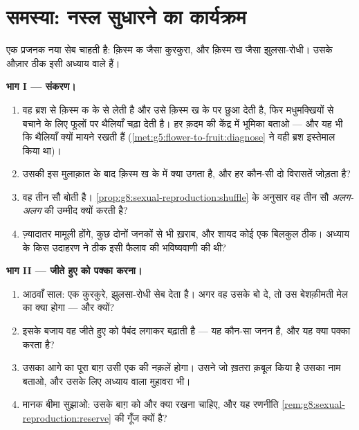 \section{समस्या: नस्ल सुधारने का कार्यक्रम}

\begin{problem}\label{pb:g8:sexual-reproduction:1}
एक प्रजनक नया सेब चाहती है: क़िस्म क जैसा कुरकुरा, और क़िस्म ख जैसा
झुलसा-रोधी। उसके औज़ार ठीक इसी अध्याय वाले हैं।

\medskip\noindent\textbf{भाग I --- संकरण।}
\begin{enumerate}
  \item वह ब्रश से क़िस्म क के  से  लेती है और उसे
        क़िस्म ख के  पर छुआ देती है, फिर मधुमक्खियों से
        बचाने के लिए फूलों पर थैलियाँ चढ़ा देती है। हर क़दम की
        केंद्र में भूमिका बताओ --- और यह भी कि थैलियाँ क्यों मायने
        रखती हैं (\cref{met:g5:flower-to-fruit:diagnose} ने वही ब्रश
        इस्तेमाल किया था)।
  \item उसकी इस मुलाक़ात के बाद क़िस्म ख के  में क्या उगता है, और
        हर  कौन-सी दो विरासतें जोड़ता है?
  \item वह तीन सौ  बोती है।
        \cref{prop:g8:sexual-reproduction:shuffle} के अनुसार वह तीन
        सौ \emph{अलग-अलग}  की उम्मीद क्यों करती है?
  \item ज़्यादातर  मामूली होंगे, कुछ दोनों जनकों से भी ख़राब, और
        शायद कोई एक बिलकुल ठीक। अध्याय के किस उदाहरण ने ठीक इसी
        फैलाव की भविष्यवाणी की थी?
\end{enumerate}

\medskip\noindent\textbf{भाग II --- जीते हुए को पक्का करना।}
\begin{enumerate}[resume]
  \item आठवाँ साल: एक  कुरकुरे, झुलसा-रोधी सेब देता है। अगर वह
        उसके  बो दे, तो उस बेशक़ीमती मेल का क्या होगा --- और
        क्यों?
  \item इसके बजाय वह जीते हुए  को पैबंद लगाकर बढ़ाती है --- यह
        कौन-सा जनन है, और यह क्या पक्का करता है?
  \item उसका आगे का पूरा बाग़ उसी एक  की नक़लें होगा। उसने जो
        ख़तरा क़बूल किया है उसका नाम बताओ, और उसके लिए अध्याय वाला
        मुहावरा भी।
  \item मानक बीमा सुझाओ: उसके बाग़ को और क्या रखना चाहिए, और यह
        रणनीति \cref{rem:g8:sexual-reproduction:reserve} की गूँज
        क्यों है?
\end{enumerate}


\end{problem}
